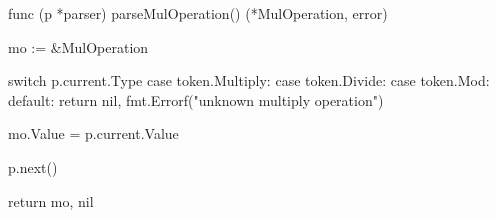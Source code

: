 func (p *parser) parseMulOperation() (*MulOperation, error) {
	mo := &MulOperation{}

	switch p.current.Type {
	case token.Multiply:
	case token.Divide:
	case token.Mod:
	default:
		return nil, fmt.Errorf("unknown multiply operation")
	}

	mo.Value = p.current.Value

	p.next()

	return mo, nil
}